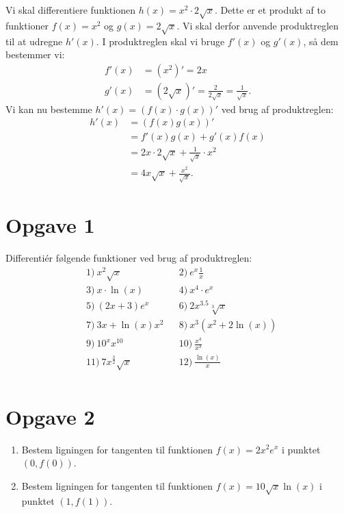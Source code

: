 \begin{exa}
Vi skal differentiere funktionen $h(x) = x^2\cdot 2\sqrt{x}$. Dette er et produkt af to funktioner
$f(x) = x^2$ og $g(x)= 2\sqrt{x}$. Vi skal derfor anvende produktreglen til at udregne $h'(x)$. I produktreglen skal vi bruge $f'(x)$ og $g'(x)$, så dem bestemmer vi:
\begin{align*}
f'(x) &= (x^2)' = 2x\\
g'(x) &= (2\sqrt{x})' = \frac{2}{2\sqrt{x}} = \frac{1}{\sqrt{x}}.
\end{align*} 
Vi kan nu bestemme $h'(x) = (f(x)\cdot g(x))'$ ved brug af produktreglen:
\begin{align*}
h'(x) &= (f(x)g(x))' \\
&= f'(x)g(x)+g'(x)f(x) \\
&= 2x\cdot 2\sqrt{x} + \frac{1}{\sqrt{x}}\cdot x^2\\
&= 4x\sqrt{x} + \frac{x^2}{\sqrt{x}}.
\end{align*}
\end{exa}

\section*{Opgave 1}
Differentiér følgende funktioner ved brug af produktreglen:
\begin{align*}
&1) \   x^2\sqrt{x}   &&2) \  e^x\frac{1}{x}     \\
&3) \  x\cdot \ln(x)  &&4) \  x^4\cdot e^x	\\
&5) \   (2x+3)e^x  &&6) \   2x^{3.5}\sqrt[3]{x}    \\
&7) \  3x + \ln(x)x^2    &&8) \ x^3(x^2+2\ln(x))      \\
&9) \  10^xx^{10}    &&10) \  \frac{x^4}{x^3}     \\
&11) \   7x^{\frac{3}{2}}\sqrt{x}   &&12) \     \frac{\ln(x)}{x}   \\
\end{align*}
\section*{Opgave 2}
\begin{enumerate}[label=\roman*)]
\item Bestem ligningen for tangenten til funktionen $f(x)=2x^2e^x$ i punktet $(0,f(0))$.
\item Bestem ligningen for tangenten til funktionen $f(x) = 10\sqrt{x}\ln(x)$ i punktet $(1,f(1))$.
\end{enumerate}
